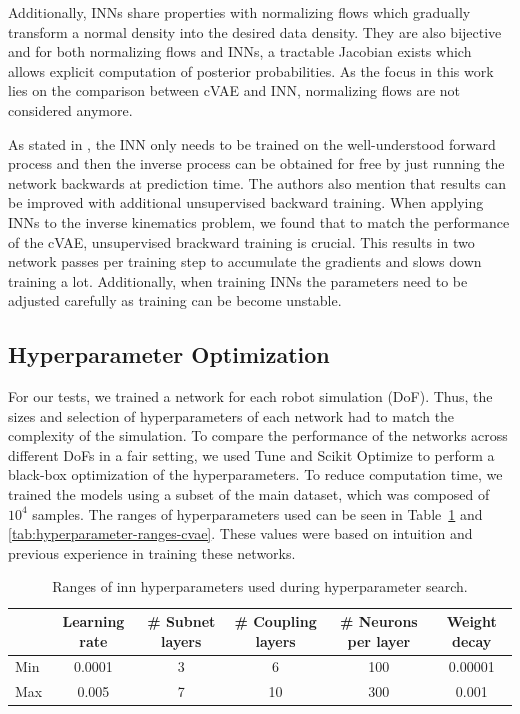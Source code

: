\documentclass[conference]{IEEEtran}
\begin{document}
Additionally, INNs share properties with normalizing flows \cite{normalizingFlows2010, normalizingFlows2013} which gradually transform a normal density into the desired data density. They are also bijective and for both normalizing flows and INNs, a tractable Jacobian exists which allows explicit computation of posterior probabilities. As the focus in this work lies on the comparison between cVAE and INN, normalizing flows are not considered anymore.

As stated in \cite{Ardizzone2018}, the INN only needs to be trained on the well-understood forward process and then the inverse process can be obtained for free by just running the network backwards at prediction time. The authors also mention that results can be improved with additional unsupervised backward training. When applying INNs to the inverse kinematics problem, we found that to match the performance of the cVAE, unsupervised brackward training is crucial. This results in two network passes per training step to accumulate the gradients and slows down training a lot. Additionally, when training INNs the parameters need to be adjusted carefully as training can be become unstable.

\subsection*{Hyperparameter Optimization}

For our tests, we trained a network for each robot simulation (DoF). Thus, the sizes and selection of hyperparameters of each network had to match the complexity of the simulation. To compare the performance of the networks across different DoFs in a fair setting, we used Tune \cite{liaw2018tune} and Scikit Optimize \cite{scikit-optimize} to perform a black-box optimization of the hyperparameters. To reduce computation time, we trained the models using a subset of the main dataset, which was composed of \( 10^4 \) samples. The ranges of hyperparameters used can be seen in Table~\ref{tab:hyperparameter-ranges-inn} and \ref{tab:hyperparameter-ranges-cvae}. These values were based on intuition and previous experience in training these networks.

\begin{table}[h]
    \caption{Ranges of inn hyperparameters used during hyperparameter search.}
    \label{tab:hyperparameter-ranges-inn}
    \centering
    \begin{tabular}{|l|c|c|c|c|c|}
    \hline
      & Learning rate & \# Subnet layers & \# Coupling layers & \# Neurons per layer & Weight decay \\
     \hline
     Min  & 0.0001 & 3 & 6 & 100 & 0.00001 \\
     Max  & 0.005 & 7 & 10 & 300 & 0.001 \\
     \hline
    \end{tabular}
\end{table}
\end{document}
